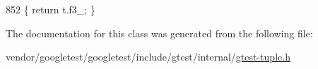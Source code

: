 \begin{DoxyCode}
852                              \{ \textcolor{keywordflow}{return} t.f3\_; \}
\end{DoxyCode}


The documentation for this class was generated from the following file\+:\begin{DoxyCompactItemize}
\item 
vendor/googletest/googletest/include/gtest/internal/\hyperlink{gtest-tuple_8h}{gtest-\/tuple.\+h}\end{DoxyCompactItemize}
